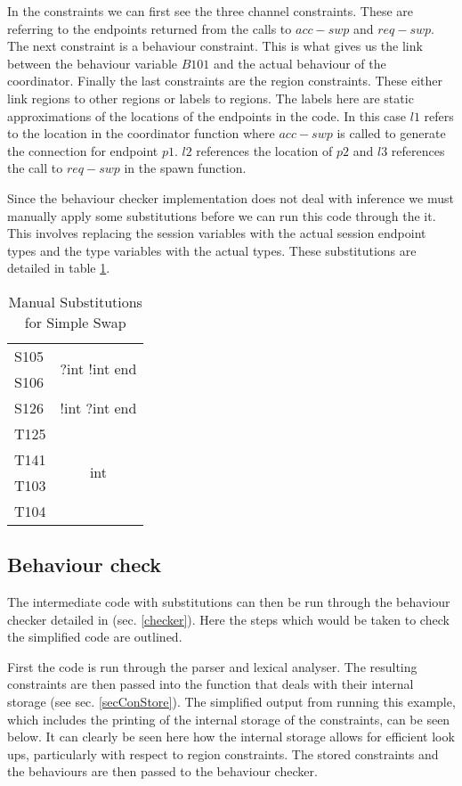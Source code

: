 In the constraints we can first see the three channel constraints. These are referring to the endpoints returned from the calls to $acc-swp$ and $req-swp$. The next constraint is a behaviour constraint. This is what gives us the link between the behaviour variable $B101$ and the actual behaviour of the coordinator. Finally the last constraints are the region constraints. These either link regions to other regions or labels to regions. The labels here are static approximations of the locations of the endpoints in the code. In this case $l1$ refers to the location in the coordinator function where $acc-swp$ is called to generate the connection for endpoint $p1$. $l2$ references the location of $p2$ and $l3$ references the call to $req-swp$ in the spawn function. 

Since the behaviour checker implementation does not deal with inference we must manually apply some substitutions before we can run this code through the it. This involves replacing the session variables with the actual session endpoint types and the type variables with the actual types. These substitutions are detailed in table \ref{subs}. 

\begin{table}
\centering
\begin{tabular}{|l |c|}
\hline
S105 & \multirow{2}{*}{?int !int end} \\
S106 & \\ \hline
S126 & !int ?int end \\ \hline
T125 & \multirow{4}{*}{int} \\
T141 & \\ 
T103 & \\
T104 & \\ \hline
\end{tabular}
\caption{Manual Substitutions for Simple Swap}
\label{subs}
\end{table}

\subsection{Behaviour check}

The intermediate code with substitutions can then be run through the behaviour checker detailed in (sec. \ref{checker}). Here the steps which would be taken to check the simplified code are outlined. 

First the code is run through the parser and lexical analyser. The resulting constraints are then passed into the function that deals with their internal storage (see sec. \ref{secConStore}). The simplified output from running this example, which includes the printing of the internal storage of the constraints, can be seen below. It can clearly be seen here how the internal storage allows for efficient look ups, particularly with respect to region constraints. The stored constraints and the behaviours are then passed to the behaviour checker. 

